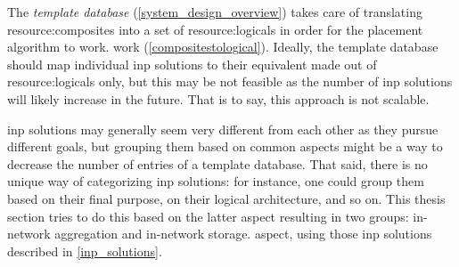The \textit{template database}
\ifdefined\THESISSUMMARY \else
(\autoref{system_design_overview})
\fi
takes care of translating \glspl{resource:composite} into a set of \glspl{resource:logical} in order for the placement algorithm to
\ifdefined\THESISSUMMARY
work.
\else
work (\autoref{compositestological}).
\fi
Ideally, the template database should map individual \gls{inp} solutions to their equivalent made out of \glspl{resource:logical} only, but this may be not feasible as the number of \gls{inp} solutions will likely increase in the future.
That is to say, this approach is not scalable.
\ifdefined\THESISSUMMARY \else

\fi
\gls{inp} solutions may generally seem very different from each other as they pursue different goals, but grouping them based on common aspects might be a way to decrease the number of entries of a template database. %
That said, there is no unique way of categorizing \gls{inp} solutions: for instance, one could group them based on their final purpose, on their logical architecture, and so on.
This
\ifdefined\THESISSUMMARY
thesis
\else
section
\fi
tries to do this based on the latter
\ifdefined\THESISSUMMARY
aspect resulting in two groups: in-network aggregation and in-network storage.
\else
aspect, using those \gls{inp} solutions described in \autoref{inp_solutions}.\fi
